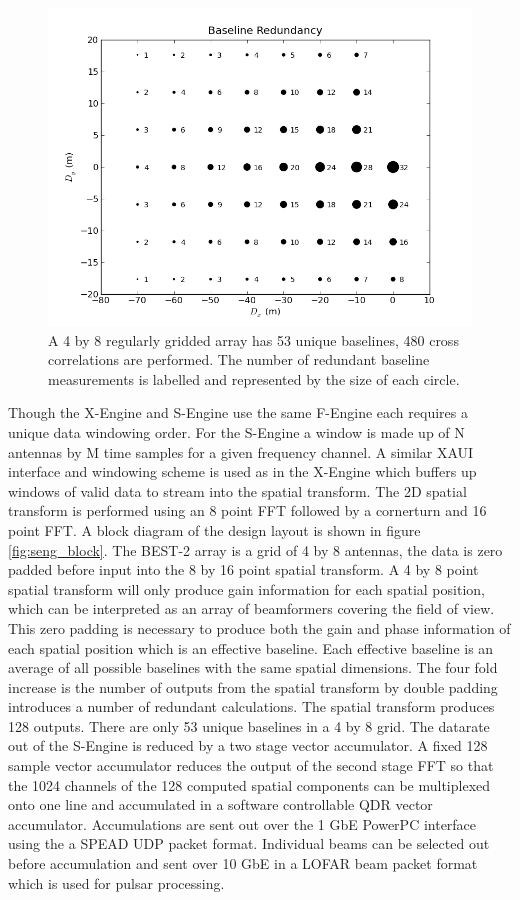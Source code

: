 \documentclass[useAMS,macros,usenatbib,onecolumn]{mn2e}
\begin{document}
\begin{figure}
    \centering
    \includegraphics[scale=0.6]{graphics/redbl.png}
    \caption{A 4 by 8 regularly gridded array has 53 unique baselines, 480 cross correlations are performed. The number of redundant baseline measurements is labelled and represented by the size of each circle.}
    \label{fig:redbl}
\end{figure}

Though the X-Engine and S-Engine use the same F-Engine each requires a unique data windowing order.
For the S-Engine a window is made up of N antennas by M time samples for a given frequency channel.
A similar XAUI interface and windowing scheme is used as in the X-Engine which buffers up windows of valid data to stream into the spatial transform.
The 2D spatial transform is performed using an 8 point FFT followed by a cornerturn and 16 point FFT.
A block diagram of the design layout is shown in figure \ref{fig:seng_block}.
The BEST-2 array is a grid of 4 by 8 antennas, the data is zero padded before input into the 8 by 16 point spatial transform.
A 4 by 8 point spatial transform will only produce gain information for each spatial position, which can be interpreted as an array of beamformers covering the field of view.
This zero padding is necessary to produce both the gain and phase information of each spatial position which is an effective baseline.
Each effective baseline is an average of all possible baselines with the same spatial dimensions.
The four fold increase is the number of outputs from the spatial transform by double padding introduces a number of redundant calculations.
The spatial transform produces 128 outputs.
There are only 53 unique baselines in a 4 by 8 grid.
The datarate out of the S-Engine is reduced by a two stage vector accumulator.
A fixed 128 sample vector accumulator reduces the output of the second stage FFT so that the 1024 channels of the 128 computed spatial components can be multiplexed onto one line and accumulated in a software controllable QDR vector accumulator.
Accumulations are sent out over the 1 GbE PowerPC interface using the a SPEAD UDP packet format.
Individual beams can be selected out before accumulation and sent over 10 GbE in a LOFAR beam packet format which is used for pulsar processing.
\end{document}
